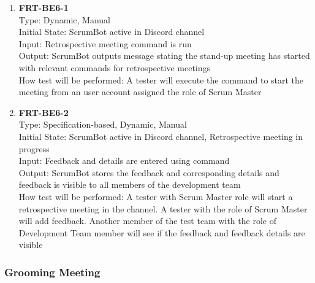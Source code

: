 \documentclass[12pt, titlepage]{article}
\begin{document}
\begin{enumerate}
    \item{\textbf{FRT-BE6-1}}\\
    Type: Dynamic, Manual\\
    Initial State: ScrumBot active in Discord channel\\
    Input: Retrospective meeting command is run\\
    Output: ScrumBot outputs message stating the stand-up meeting has started with relevant commands for retrospective meetings\\
    How test will be performed: A tester will execute the command to start the meeting from an user account assigned the role of Scrum Master\\
    
    \item{\textbf{FRT-BE6-2}}\\
    Type: Specification-based, Dynamic, Manual\\
    Initial State: ScrumBot active in Discord channel, Retrospective meeting in progress\\
    Input: Feedback and details are entered using command\\
    Output: ScrumBot stores the feedback and corresponding details and feedback is visible to all members of the development team\\
    How test will be performed: A tester with Scrum Master role will start a retrospective meeting in the channel. A tester with the role of Scrum Master will add feedback. Another member of the test team with the role of Development Team member will see if the feedback and feedback details are visible\\
\end{enumerate}

\subsubsection{Grooming Meeting}
\end{document}
